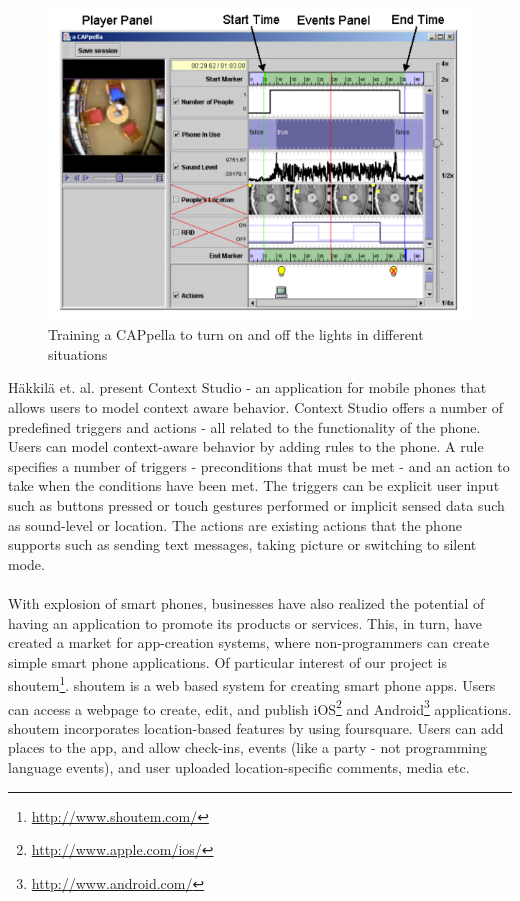 \begin{figure}
	\centering
	\includegraphics[scale=0.4]{fig/acappella}
	\caption{Training a CAPpella \cite{Dey:2004:CPD:985692.985697} to turn on and off the lights in different situations}
	\label{fig:acappella}
\end{figure}

\noindent Häkkilä et. al. present Context Studio \cite{springerlink:10.1007/11555261_73} - an application for mobile phones that allows users to model context aware behavior. Context Studio offers a number of predefined triggers and actions - all related to the functionality of the phone. Users can model context-aware behavior by adding rules to the phone. A rule specifies a number of triggers - preconditions that must be met - and an action to take when the conditions have been met. The triggers can be explicit user input such as buttons pressed or touch gestures performed or implicit sensed data such as sound-level or location. The actions are existing actions that the phone supports such as sending text messages, taking picture or switching to silent mode.
\\\\ 
With explosion of smart phones, businesses have also realized the potential of having an application to promote its products or services. This, in turn, have created a market for app-creation systems, where non-programmers can create simple smart phone applications. Of particular interest of our project is shoutem\footnote{\url{http://www.shoutem.com/}}. shoutem is a web based system for creating smart phone apps. Users can access a webpage to create, edit, and publish iOS\footnote{\url{http://www.apple.com/ios/}} and Android\footnote{\url{http://www.android.com/}} applications. shoutem incorporates location-based features by using foursquare. Users can add places to the app, and allow check-ins, events (like a party - not programming language events), and user uploaded location-specific comments, media etc. 
